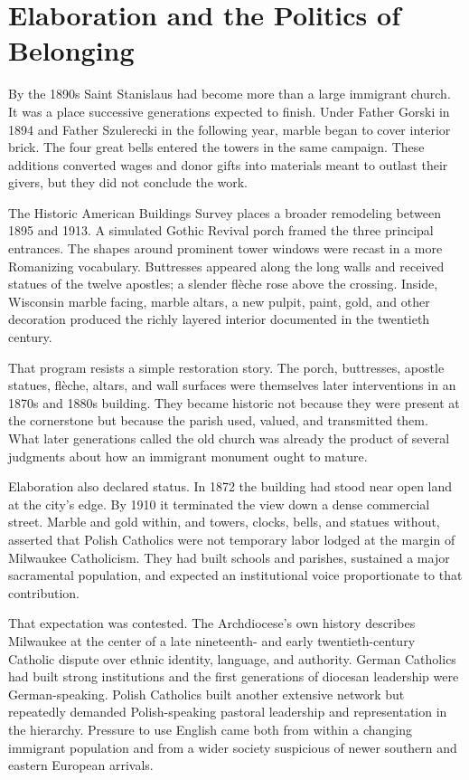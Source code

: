 \section{Elaboration and the Politics of Belonging}

By the 1890s Saint Stanislaus had become more than a large immigrant church. It was a place successive generations expected to finish. Under Father Gorski in 1894 and Father Szulerecki in the following year, marble began to cover interior brick. The four great bells entered the towers in the same campaign. These additions converted wages and donor gifts into materials meant to outlast their givers, but they did not conclude the work.

The Historic American Buildings Survey places a broader remodeling between 1895 and 1913. A simulated Gothic Revival porch framed the three principal entrances. The shapes around prominent tower windows were recast in a more Romanizing vocabulary. Buttresses appeared along the long walls and received statues of the twelve apostles; a slender flèche rose above the crossing. Inside, Wisconsin marble facing, marble altars, a new pulpit, paint, gold, and other decoration produced the richly layered interior documented in the twentieth century.

That program resists a simple restoration story. The porch, buttresses, apostle statues, flèche, altars, and wall surfaces were themselves later interventions in an 1870s and 1880s building. They became historic not because they were present at the cornerstone but because the parish used, valued, and transmitted them. What later generations called the old church was already the product of several judgments about how an immigrant monument ought to mature.

Elaboration also declared status. In 1872 the building had stood near open land at the city's edge. By 1910 it terminated the view down a dense commercial street. Marble and gold within, and towers, clocks, bells, and statues without, asserted that Polish Catholics were not temporary labor lodged at the margin of Milwaukee Catholicism. They had built schools and parishes, sustained a major sacramental population, and expected an institutional voice proportionate to that contribution.

That expectation was contested. The Archdiocese's own history describes Milwaukee at the center of a late nineteenth- and early twentieth-century Catholic dispute over ethnic identity, language, and authority. German Catholics had built strong institutions and the first generations of diocesan leadership were German-speaking. Polish Catholics built another extensive network but repeatedly demanded Polish-speaking pastoral leadership and representation in the hierarchy. Pressure to use English came both from within a changing immigrant population and from a wider society suspicious of newer southern and eastern European arrivals.

